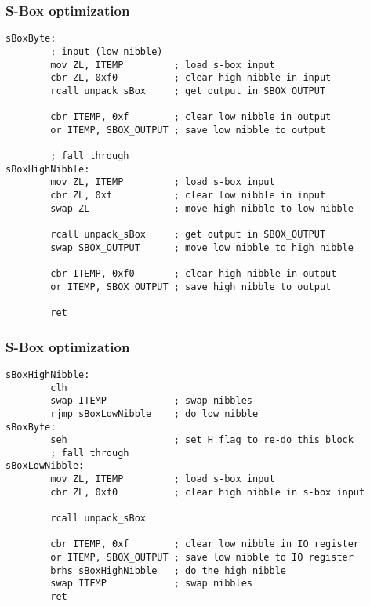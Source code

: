 \documentclass{beamer}
\begin{document}
\begin{frame}[fragile]
\frametitle{S-Box optimization}
\begin{lstlisting}
sBoxByte:
        ; input (low nibble)
        mov ZL, ITEMP         ; load s-box input
        cbr ZL, 0xf0          ; clear high nibble in input
        rcall unpack_sBox     ; get output in SBOX_OUTPUT

        cbr ITEMP, 0xf        ; clear low nibble in output
        or ITEMP, SBOX_OUTPUT ; save low nibble to output

        ; fall through
sBoxHighNibble:
        mov ZL, ITEMP         ; load s-box input
        cbr ZL, 0xf           ; clear low nibble in input
        swap ZL               ; move high nibble to low nibble

        rcall unpack_sBox     ; get output in SBOX_OUTPUT
        swap SBOX_OUTPUT      ; move low nibble to high nibble

        cbr ITEMP, 0xf0       ; clear high nibble in output
        or ITEMP, SBOX_OUTPUT ; save high nibble to output

        ret
\end{lstlisting}
\end{frame}

\begin{frame}[fragile]
\frametitle{S-Box optimization}
\begin{lstlisting}
sBoxHighNibble:
        clh
        swap ITEMP            ; swap nibbles
        rjmp sBoxLowNibble    ; do low nibble
sBoxByte:
        seh                   ; set H flag to re-do this block
        ; fall through
sBoxLowNibble:
        mov ZL, ITEMP         ; load s-box input
        cbr ZL, 0xf0          ; clear high nibble in s-box input

        rcall unpack_sBox

        cbr ITEMP, 0xf        ; clear low nibble in IO register
        or ITEMP, SBOX_OUTPUT ; save low nibble to IO register
        brhs sBoxHighNibble   ; do the high nibble
        swap ITEMP            ; swap nibbles
        ret
\end{lstlisting}
\end{frame}
\end{document}
